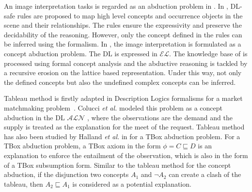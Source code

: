 \documentclass{article}
\begin{document}
An image interpretation tasks is regarded as an abduction problem in \cite{atif2014explanatory,gries2010probabilistic,neumann2008scene,shanahan2005perception}.
In \cite{neumann2008scene}, DL-safe rules are proposed to map high level concepts and occurrence objects in the scene and their relationships.
The rules ensure the expressivity and preserve the decidability of the reasoning. However, only the concept defined in the rules can be inferred using 
the formalism. In \cite{atif2014explanatory}, the image interpretation is formulated as a concept abduction problem.
The DL is expressed in $\mathcal{EL}$. The knowledge base of is processed using formal concept analysis and the abductive reasoning is tackled
by a recursive erosion on the lattice based representation. Under this way, not only the defined concepts but also the undefined complex concepts  
can be inferred.


Tableau method is firstly adapted in Description Logics formalisms for a market matchmaking problem~\cite{colucci2004uniform}.
Colucci \textit{et al.} modeled this problem as a concept abduction in the DL $\mathcal{ALN}$ \cite{colucci2004uniform},
where the observations are the demand and the supply is treated as the explanation for the meet of the request.
Tableau method has also been studied by Halland \textit{et al.} in \cite{halland2014tbox} for a TBox abduction problem.
For a TBox abduction problem, a TBox axiom in the form $\phi= C\sqsubseteq D$ is an explanation to enforce the entailment of the observation,
which is also in the form of  a TBox subsumption form. Similar to the tableau method for the  concept abduction, if the disjunction
two concepts $A_1$  and $\neg A_2$ can create a clash of the tableau, then $A_2 \sqsubseteq A_1$ is considered as a potential explanation.
\end{document}
